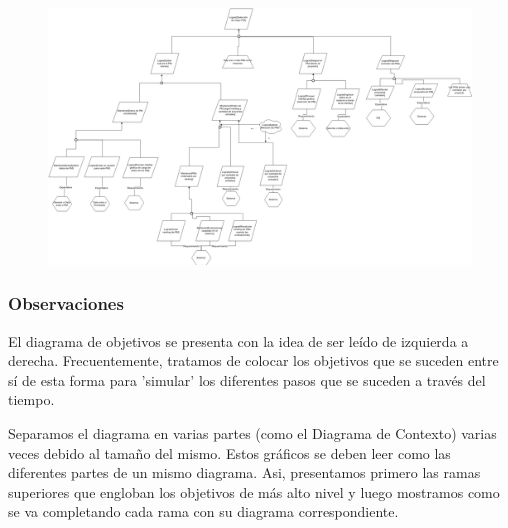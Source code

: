 \begin{figure}[H]
    \centering
    \includegraphics[width=8in, keepaspectratio, angle=90]{imagenes/objetivos-seleccion-mejor-pm.png}
\end{figure}

\subsubsection{Observaciones}

El diagrama de objetivos se presenta con la idea de ser leído de izquierda a derecha. Frecuentemente, tratamos de colocar los objetivos que se suceden entre sí de esta forma para 'simular' los diferentes pasos que se suceden a través del tiempo.

Separamos el diagrama en varias partes (como el Diagrama de Contexto) varias veces debido al tamaño del mismo. Estos gráficos se deben leer como las diferentes partes de un mismo diagrama. Asi, presentamos primero las ramas superiores que engloban los objetivos de más alto nivel y luego mostramos como se va completando cada rama con su diagrama correspondiente.
